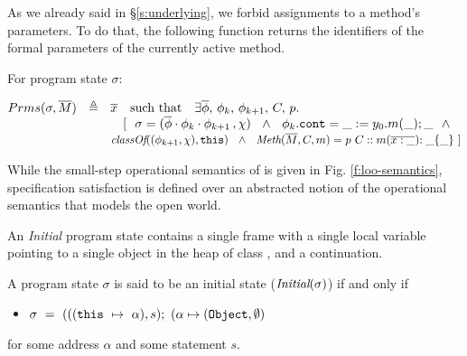 As we already said in \S \ref{s:underlying}, we forbid assignments to a method's parameters. 
To do that, the following function returns the  identifiers of the formal parameters of the currently active method.



\begin{definition}
For program state $\sigma$:
\label{def:params}

$\Formals \sigma \Mtwo \ \ \triangleq \ \  \overline x \ \ \ \mbox{such that} \ \  \  \exists \overline {\phi},\,\phi_k, \, \phi_{k+1}, \,C,\,p.$\\
$\strut \hspace{3.2cm} [   \ \ \sigma =  (\overline {\phi}\cdot{\phi_k}\cdot{\phi_{k+1}}\,, \chi) 
\  \ \wedge\  \ \phi_k.\prg{cont}=\_:=y_0.m(\_); \_ \  \  \wedge\ \ $\\
$\strut \hspace{3.2cm} \class{(\phi_{k+1},\chi)}  {\prg{this} }\  \ \wedge\ \ \meth{\Mtwo} {C} {m} = p \ C::m(\overline{x : \_}){:\_}\{\_\} \ ] $
\end{definition}





While the small-step operational semantics of \LangOO is given in Fig. \ref{f:loo-semantics},
specification satisfaction is defined over an abstracted notion of 
the operational semantics that models the open world. %




An \emph{Initial} program state contains a single frame 
with a single local variable  pointing to a single object 
in the heap of class , and a continuation.
\begin{definition}
\label{def:initial}
A program state $\sigma$ is said to be an initial state ($\textit{Initial}(\sigma)$)
if and only if
\begin{itemize}
\item
$\sigma\ =\  ( ((\prg{this}\ \mapsto\ \alpha), s); \  (\alpha \mapsto (\prg{Object}, \emptyset)$
\end{itemize} 
for some address $\alpha$ and some statement $s$.
\end{definition}


